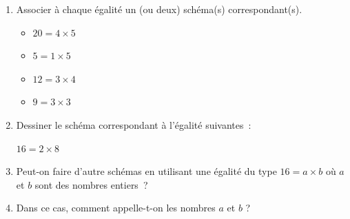\documentclass[activite]{thedocument}
\begin{document}
\begin{enumerate}
    \item Associer à chaque égalité un (ou deux) schéma(s) correspondant(s).\vskip10pt
    \begin{minipage}{.5\linewidth}
        \begin{itemize}
            \item $20=4\times5$
            \item $5=1\times5$
            \item $12=3\times4$
            \item $9=3\times3$
        \end{itemize}
    \end{minipage}%
    \begin{minipage}{.5\linewidth}
    \end{minipage}
    \item Dessiner le schéma correspondant à l'égalité suivantes~:
    \par$16=2\times8$\par\vskip100pt
    \item Peut-on faire d'autre schémas en utilisant une égalité du type
    $16=a\times b$ où $a$ et $b$ sont des nombres entiers~?\vskip50pt
    \item Dans ce cas, comment appelle-t-on les nombres $a$ et $b$ ?
    \dotedline\dotedline\dotedline
\end{enumerate}
\end{document}
